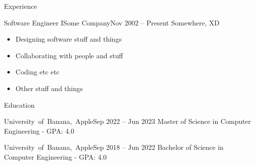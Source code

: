 \documentclass[]{../mcdowellcv}
\begin{document}
\makeheader

\begin{cvsection}{Experience}

    \begin{cvsubsection}{Software Engineer I}{Some Company}{Nov 2002 -- Present}
        Somewhere, XD
        \vspace{2.5mm}
        \begin{itemize}
            \item Designing software stuff and things
            \item Collaborating with people and stuff
            \item Coding etc etc
            \item Other stuff and things
        \end{itemize}
    \end{cvsubsection}
    
\end{cvsection}

\begin{cvsection}{Education}

    \begin{cvsubsection}{\mbox {University of Banana, Apple}}{}{Sep 2022 -- Jun 2023}
        Master of Science in Computer Engineering - GPA: 4.0
    \end{cvsubsection}
    
    \begin{cvsubsection}{\mbox {University of Banana, Apple}}{}{Sep 2018 -- Jun 2022}
        Bachelor of Science in Computer Engineering - GPA: 4.0
    \end{cvsubsection}
     
\end{cvsection}
\end{document}
